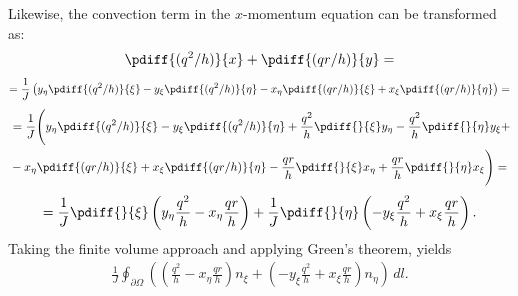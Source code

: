 %
Likewise, the convection term in the $x$-momentum equation can be transformed as:
%
\begin{align}
	\pdiff{(q^2/h)}{x} + \pdiff{(qr/h)}{y} =
\end{align}
\begin{align}
	= \frac{1}{J} \left(y_{\eta} \pdiff{(q^2/h)}{\xi} - y_{\xi} \pdiff{(q^2/h)}{\eta} -x_{\eta} \pdiff{(qr/h)}{\xi} + x_{\xi} \pdiff{(qr/h)}{\eta}\right) =
\end{align}
\begin{align}
	\begin{aligned}
		&= \frac{1}{J} \Bigg(y_{\eta} \pdiff{(q^2/h)}{\xi} - y_{\xi} \pdiff{(q^2/h)}{\eta} + \frac{q^2}{h} \pdiff{}{\xi} y_{\eta} - \frac{q^2}{h} \pdiff{}{\eta} y_{\xi} +  \\
		&-x_{\eta} \pdiff{(qr/h)}{\xi} + x_{\xi} \pdiff{(qr/h)}{\eta} - \frac{qr}{h} \pdiff{}{\xi} x_{\eta} + \frac{qr}{h} \pdiff{}{\eta} x_{\xi} \Bigg) =
	\end{aligned}
\end{align}
\begin{align}
	= \frac{1}{J} \pdiff{}{\xi}\left(y_{\eta} \frac{q^2}{h} - x_{\eta} \frac{qr}{h} \right) + \frac{1}{J} \pdiff{}{\eta}\left(-y_{\xi} \frac{q^2}{h} + x_{\xi} \frac{qr}{h} \right).
\end{align}
%
Taking the finite volume approach and applying Green's theorem, yields
\begin{align}
    \frac{1}{J}\oint_{\partial\Omega} \left( \left( \frac{q^2}{h} - x_{\eta} \frac{qr}{h} \right) n_\xi + \left(-y_{\xi} \frac{q^2}{h} + x_{\xi} \frac{qr}{h} \right) n_\eta \right)\, dl.
\end{align}

